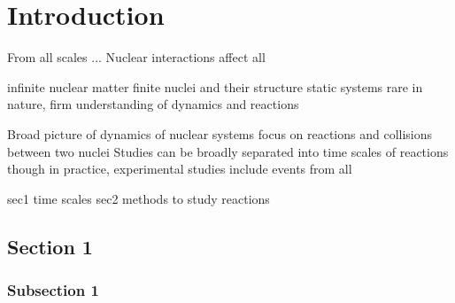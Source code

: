
\chapter{Introduction}\label{chapters:Introduction}
\vspace{-7mm}

From all scales ...
Nuclear interactions affect all

infinite nuclear matter
finite nuclei and their structure
static systems rare in nature, firm understanding of dynamics and reactions

Broad picture of dynamics of nuclear systems
focus on reactions and collisions between two nuclei
Studies can be broadly separated into time scales of reactions
though in practice, experimental studies include events from all

sec1 time scales
sec2 methods to study reactions

\section{Section 1}\label{sec:ch_1_sec_1}

\subsection{Subsection 1}\label{subsec:subsec_1.1.1}


\clearpage
